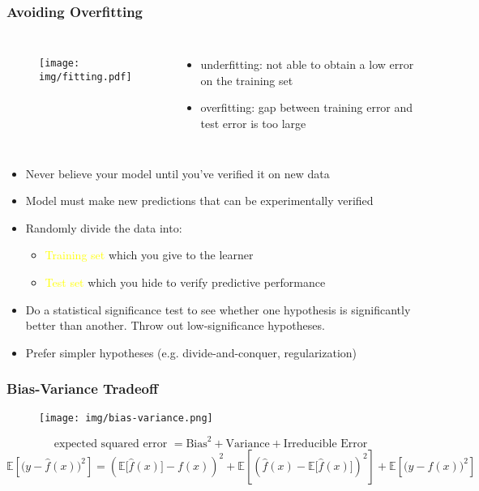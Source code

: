 \documentclass[UTF8,11pt,colorlinks,compress,openany]{beamer}%
\begin{document}
\begin{frame}\frametitle{Avoiding Overfitting}
\begin{columns}
\begin{figure}[H]
\texttt{[image: img/fitting.pdf]}
\end{figure}
\begin{itemize}
	\item underfitting: not able to obtain a low error on the training set
	\item overfitting: gap between training error and test error is too large
\end{itemize}
\end{columns}
\begin{itemize}
	\item Never believe your model until you've verified it on new data
	\item Model must make new predictions that can be experimentally verified
	\item Randomly divide the data into:
	\begin{itemize}
		\item \textcolor{yellow}{Training set} which you give to the learner
		\item \textcolor{yellow}{Test set} which you hide to verify predictive performance
	\end{itemize}
	\item Do a statistical significance test to see whether one hypothesis is significantly better than another. Throw out low-significance hypotheses.
	\item Prefer simpler hypotheses (e.g. divide-and-conquer, regularization)
\end{itemize}
\end{frame}

\begin{frame}\frametitle{Bias-Variance Tradeoff}
\begin{figure}[H]
\texttt{[image: img/bias-variance.png]}
\end{figure}
\[\mbox{expected squared error } = \mbox{Bias}^2 + \mbox{Variance} + \mbox{Irreducible Error} \]
\[\mathbb{E}\left[\big(y-\hat{f}(x)\big)^2\right]=\left(\mathbb{E}\big[\hat{f}(x)\big]-f(x)\right)^2 + \mathbb{E}\left[\left(\hat{f}(x)-\mathbb{E}\big[\hat{f}(x)\big]\right)^2\right] +\mathbb{E}\left[\big(y-f(x)\big)^2\right]\]
\end{frame}
\end{document}
